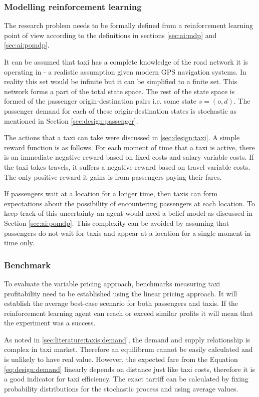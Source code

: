\subsubsection{Modelling reinforcement learning}
\label{sec:design:ai}

The research problem needs to be formally defined from a reinforcement learning
point of view according to the definitions in sections \ref{sec:ai:mdp} and
\ref{sec:ai:pomdp}.

It can be assumed that taxi has a complete knowledge of the road network it is
operating in - a realistic assumption given modern GPS navigation systems. In
reality this set would be infinite but it can be simplified to a finite set.
This network forms a part of the total state space. The rest of the state space
is formed of the passenger origin-destination pairs i.e. some state \(s = (o,
d) \). The passenger demand for each of these origin-destination states is
stochastic as mentioned in Section \ref{sec:design:passenger}. 

The actions that a taxi can take were discussed in \ref{sec:design:taxi}. A
simple reward function is as follows. For each moment of time that a taxi is
active, there is an immediate negative reward based on fixed costs and salary
variable costs. If the taxi takes travels, it suffers a negative reward based
on travel variable costs. The only positive reward it gains is from passengers
paying their fares.

If passengers wait at a location for a longer time, then taxis can form
expectations about the possibility of encountering passengers at each location.
To keep track of this uncertainty an agent would need a belief model as
discussed in Section \ref{sec:ai:pomdp}. This complexity can be avoided by
assuming that passengers do not wait for taxis and appear at a location for a
single moment in time only.

\subsubsection{Benchmark} 

To evaluate the variable pricing approach, benchmarks measuring taxi
profitability need to be established using the linear pricing approach. It will
establish the average best-case scenario for both passengers and taxis. If the
reinforcement learning agent can reach or exceed similar profits it will mean
that the experiment was a success.

As noted in \ref{sec:literature:taxis:demand}, the demand and supply
relationship is complex in taxi market. Therefore an equilibrum cannot be
easily calculated and is unlikely to have real value. However, the expected
fare from the Equation \ref{eq:design:demand} linearly depends on distance just
like taxi costs, therefore it is a good indicator for taxi efficiency. The
exact tarriff can be calculated by fixing probability distributions for the
stochastic process and using average values. 

